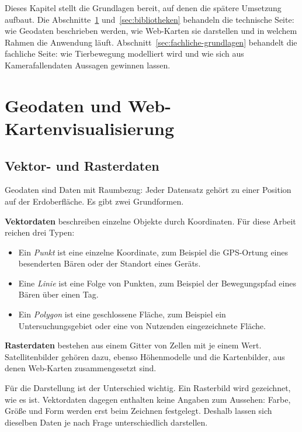 \documentclass[12pt,a4paper]{report}
\begin{document}
Dieses Kapitel stellt die Grundlagen bereit, auf denen die spätere Umsetzung aufbaut. Die
Abschnitte~\ref{sec:geodaten} und~\ref{sec:bibliotheken} behandeln die technische Seite:
wie Geodaten beschrieben werden, wie Web-Karten sie darstellen und in welchem Rahmen die
Anwendung läuft. Abschnitt~\ref{sec:fachliche-grundlagen} behandelt die fachliche Seite:
wie Tierbewegung modelliert wird und wie sich aus Kamerafallendaten Aussagen gewinnen
lassen.

\section{Geodaten und Web-Kartenvisualisierung}
\label{sec:geodaten}

\subsection{Vektor- und Rasterdaten}

Geodaten sind Daten mit Raumbezug: Jeder Datensatz gehört zu einer Position auf der
Erdoberfläche. Es gibt zwei Grundformen.

\textbf{Vektordaten} beschreiben einzelne Objekte durch Koordinaten. Für diese Arbeit
reichen drei Typen:

\begin{itemize}
    \item Ein \emph{Punkt} ist eine einzelne Koordinate, zum Beispiel die GPS-Ortung eines
    besenderten Bären oder der Standort eines Geräts.
    \item Eine \emph{Linie} ist eine Folge von Punkten, zum Beispiel der Bewegungspfad eines
    Bären über einen Tag.
    \item Ein \emph{Polygon} ist eine geschlossene Fläche, zum Beispiel ein
    Untersuchungsgebiet oder eine von Nutzenden eingezeichnete Fläche.
\end{itemize}

\textbf{Rasterdaten} bestehen aus einem Gitter von Zellen mit je einem Wert.
Satellitenbilder gehören dazu, ebenso Höhenmodelle und die Kartenbilder, aus denen
Web-Karten zusammengesetzt sind.

Für die Darstellung ist der Unterschied wichtig. Ein Rasterbild wird gezeichnet, wie es
ist. Vektordaten dagegen enthalten keine Angaben zum Aussehen: Farbe, Größe und Form
werden erst beim Zeichnen festgelegt. Deshalb lassen sich dieselben Daten je nach Frage
unterschiedlich darstellen.
\end{document}

